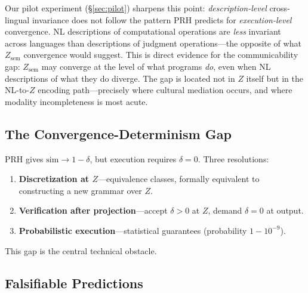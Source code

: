 \documentclass{article}
\theoremstyle{definition}
\newcommand{\Zsem}{Z_{\text{sem}}}
\begin{document}
Our pilot experiment (\S\ref{sec:pilot}) sharpens this point: \emph{description-level} cross-lingual invariance does not follow the pattern PRH predicts for \emph{execution-level} convergence. NL descriptions of computational operations are \emph{less} invariant across languages than descriptions of judgment operations---the opposite of what $\Zsem$ convergence would suggest. This is direct evidence for the communicability gap: $\Zsem$ may converge at the level of what programs \emph{do}, even when NL descriptions of what they do diverge. The gap is located not in $Z$ itself but in the NL-to-$Z$ encoding path---precisely where cultural mediation occurs, and where modality incompleteness is most acute.

\subsection{The Convergence-Determinism Gap}

PRH gives $\mathrm{sim} \to 1 - \delta$, but execution requires $\delta = 0$. Three resolutions:
\begin{enumerate}[nosep]
  \item \textbf{Discretization at $Z$}---equivalence classes, formally equivalent to constructing a new grammar over $Z$.
  \item \textbf{Verification after projection}---accept $\delta > 0$ at $Z$, demand $\delta = 0$ at output.
  \item \textbf{Probabilistic execution}---statistical guarantees (probability $1 - 10^{-9}$).
\end{enumerate}
This gap is the central technical obstacle.

\subsection{Falsifiable Predictions}\label{sec:predictions}
\end{document}
